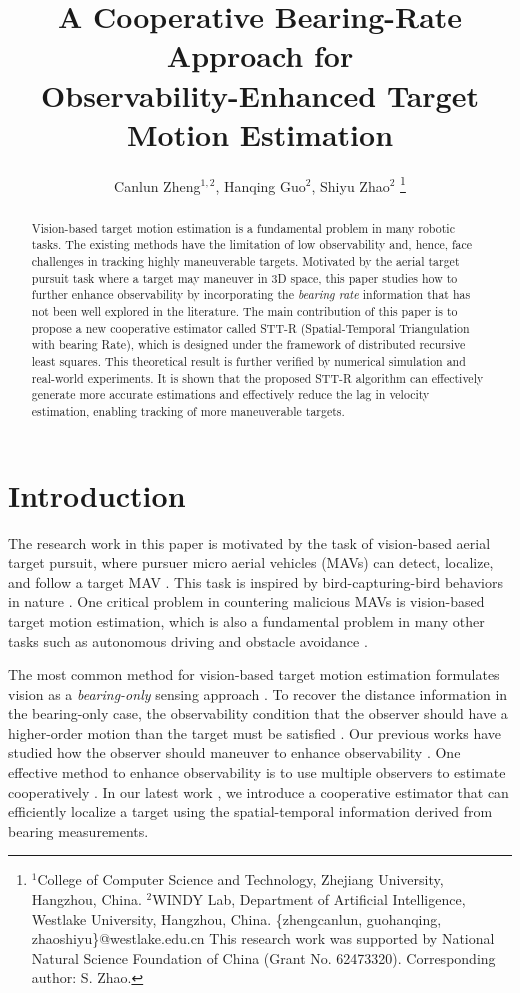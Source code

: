 \documentclass[letterpaper, 10 pt, conference]{ieeeconf}  %
\title{A Cooperative Bearing-Rate Approach for \\
Observability-Enhanced Target Motion Estimation
}
\author{Canlun Zheng$^{1,2}$, Hanqing Guo$^2$, Shiyu Zhao$^2$
\thanks{$^1$College of Computer Science and Technology, Zhejiang University, Hangzhou, China. $^2$WINDY Lab, Department of Artificial Intelligence, Westlake University, Hangzhou, China. {\{zhengcanlun, guohanqing, zhaoshiyu\}@westlake.edu.cn}
This research work was supported by National Natural Science Foundation of China (Grant No. 62473320). Corresponding author: S. Zhao.
}
}
\begin{document}
\maketitle
\begin{abstract}	
Vision-based target motion estimation is a fundamental problem in many robotic tasks. The existing methods have the limitation of low observability and, hence, face challenges in tracking highly maneuverable targets. Motivated by the aerial target pursuit task where a target may maneuver in 3D space, this paper studies how to further enhance observability by incorporating the \emph{bearing rate} information that has not been well explored in the literature. The main contribution of this paper is to propose a new cooperative estimator called STT-R (Spatial-Temporal Triangulation with bearing Rate), which is designed under the framework of distributed recursive least squares. This theoretical result is further verified by numerical simulation and real-world experiments. It is shown that the proposed STT-R algorithm can effectively generate more accurate estimations and effectively reduce the lag in velocity estimation, enabling tracking of more maneuverable targets.
\end{abstract}

\section{Introduction}

The research work in this paper is motivated by the task of vision-based aerial target pursuit, where pursuer micro aerial vehicles (MAVs) can detect, localize, and follow a target MAV \cite{vrba2020marker,li2022three,saini2019markerless}. This task is inspired by bird-capturing-bird behaviors in nature \cite{brighton2019hawks}. 
One critical problem in countering malicious MAVs is vision-based target motion estimation, which is also a fundamental problem in many other tasks such as autonomous driving and obstacle avoidance \cite{griffin2021depth}.

The most common method for vision-based target motion estimation formulates vision as a \emph{bearing-only} sensing approach \cite{li2022three, su2022bearing, sharma2011graph}.
To recover the distance information in the bearing-only case, the observability condition that the observer should have a higher-order motion than the target must be satisfied \cite{ning2024bearingangle}. Our previous works have studied how the observer should maneuver to enhance observability \cite{li2022three, flayac2023nonuniform,ning2024bearingangle}.
One effective method to enhance observability is to use multiple observers to estimate cooperatively \cite{sharma2011graph, sharma2013bearing, zhao2014optimal,schiano2018dynamic}.
In our latest work \cite{zheng2023optimal}, we introduce a cooperative estimator that can efficiently localize a target using the spatial-temporal information derived from bearing measurements.
\end{document}

